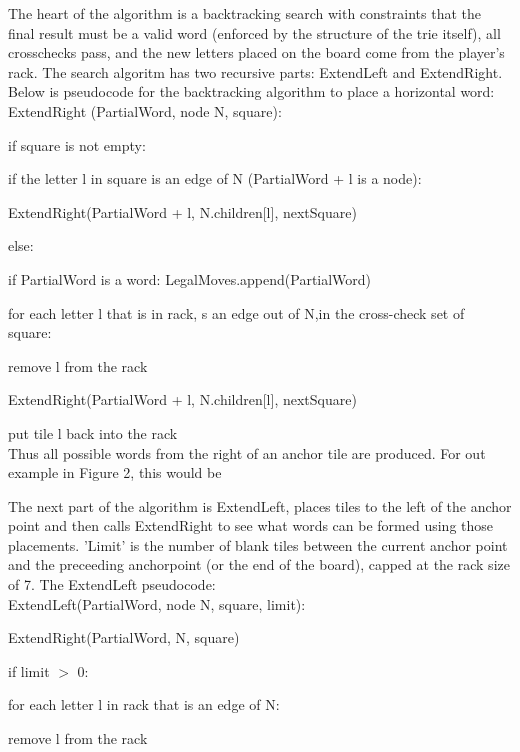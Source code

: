 \documentclass[12pt]{article}
\begin{document}
The heart of the algorithm is a backtracking search with constraints
that the final result must be a valid word (enforced by the structure
of the trie itself), all crosschecks pass, and the new letters placed
on the board come from the player's rack. The search algoritm has two
recursive parts: ExtendLeft and ExtendRight. Below is pseudocode for
the backtracking algorithm to place a horizontal word:\\

\quad ExtendRight (PartialWord, node N, square):

\quad\quad if square is not empty:

\quad\quad\quad if the letter l in square is an edge of N (PartialWord + l is a node):

\quad\quad\quad\quad ExtendRight(PartialWord + l, N.children[l], nextSquare)

\quad\quad else:

\quad\quad\quad if PartialWord is a word: LegalMoves.append(PartialWord)

\quad\quad\quad for each letter l that is in rack, s an edge out of N,in the cross-check set of square:

\quad\quad\quad\quad\quad remove l from the rack

\quad\quad\quad\quad\quad ExtendRight(PartialWord + l, N.children[l], nextSquare)

\quad\quad\quad\quad\quad put tile l back into the rack\\

Thus all possible words from the right of an anchor tile are produced. For out example in Figure 2, this would be 


The next part of the algorithm is ExtendLeft, places tiles to the left
of the anchor point and then calls ExtendRight to see what words can
be formed using those placements. 'Limit' is the number of blank tiles
between the current anchor point and the preceeding anchorpoint (or the end of the board), capped at the rack size of 7. The ExtendLeft pseudocode: \\

\quad ExtendLeft(PartialWord, node N, square, limit):

\quad\quad ExtendRight(PartialWord, N, square)

\quad\quad if limit $>$ 0: 

\quad\quad\quad for each letter l in rack that is an edge of N: 

\quad\quad\quad\quad remove l from the rack
\end{document}
